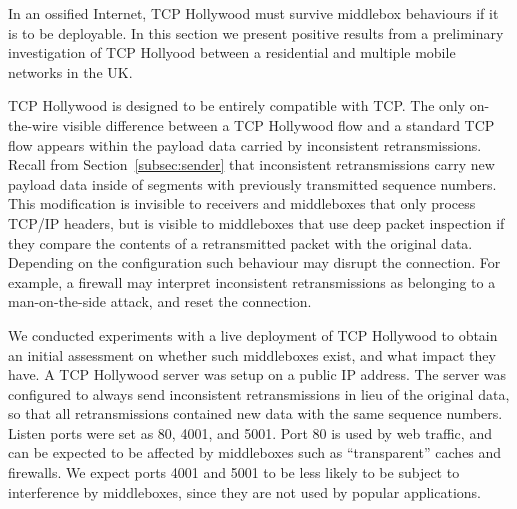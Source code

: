 

%

In an ossified Internet, TCP Hollywood must survive middlebox behaviours if it
is to be deployable. In this section we present positive results from a
preliminary investigation of TCP Hollyood between a residential and multiple
mobile networks in the UK.

TCP Hollywood is designed to be entirely compatible with TCP. The only
on-the-wire visible difference between a TCP Hollywood flow and a standard TCP
flow appears within the payload data carried by inconsistent retransmissions.
Recall from Section~\ref{subsec:sender} that inconsistent retransmissions carry
new payload data inside of segments with previously transmitted sequence
numbers. This modification is invisible to receivers and middleboxes that only
process TCP/IP headers, but is visible to middleboxes that use deep packet
inspection if they compare the contents of a retransmitted packet with the
original data. Depending on the configuration such behaviour may disrupt the
connection. For example, a firewall may interpret inconsistent retransmissions
as belonging to a man-on-the-side attack, and reset the connection.

We conducted experiments with a live deployment of TCP Hollywood to obtain an
initial assessment on whether such middleboxes exist, and what impact they have.
A TCP Hollywood server was setup on a public IP address. The server was
configured to always send inconsistent retransmissions in lieu of the original
data, so that all retransmissions contained new data with the same sequence
numbers. Listen ports were set as 80, 4001, and 5001. Port 80 is used by web
traffic, and can be expected to be affected by middleboxes such as
``transparent'' caches and firewalls. We expect ports 4001 and 5001 to be less
likely to be subject to interference by middleboxes, since they are not used by
popular applications.


